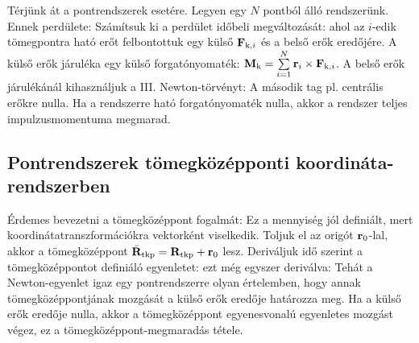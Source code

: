    Térjünk át a pontrendszerek esetére. Legyen egy $N$ pontból álló rendszerünk. Ennek perdülete:
   Számítsuk ki a perdület időbeli megváltozását:
   ahol az $i$-edik tömegpontra ható erőt felbontottuk egy külső $\mathbf{F}_{\text{k},i}$ és a belső erők eredőjére. A külső erők járuléka egy külső forgatónyomaték: $\mathbf{M}_\text{k}=\sum\limits_{i=1}^{N}\mathbf{r}_i\times\mathbf{F}_{\text{k},i}$. A belső erők járulékánál kihasználjuk a III. Newton-törvényt:
   A második tag pl. centrális erőkre nulla. Ha a rendszerre ható forgatónyomaték nulla, akkor a rendszer teljes impulzusmomentuma megmarad. 
  
  \subsection{Pontrendszerek tömegközépponti koordináta-rendszerben}
   
   Érdemes bevezetni a tömegközéppont fogalmát:
   Ez a mennyiség jól definiált, mert koordinátatranszformációkra vektorként viselkedik. Toljuk el az origót $\mathbf{r}_0$-lal, akkor a tömegközéppont $\bar{\mathbf{R}}_\text{tkp}={\mathbf{R}}_\text{tkp}+\mathbf{r}_0$ lesz. Deriváljuk idő szerint a tömegközéppontot definiáló egyenletet:
   ezt még egyszer deriválva: 
   Tehát a Newton-egyenlet igaz egy pontrendszerre olyan értelemben, hogy annak tömegközéppontjának mozgását a külső erők eredője határozza meg. Ha a külső erők eredője nulla, akkor a tömegközéppont egyenesvonalú egyenletes mozgást végez, ez a tömegközéppont-megmaradás tétele. 
   
